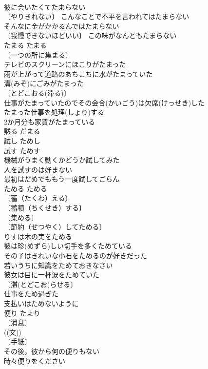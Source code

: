 \documentclass[8pt]{extreport}
\begin{document}
\begin{CJK}{UTF8}{min}
\\	彼に会いたくてたまらない 
\\	〔やりきれない〕 こんなことで不平を言われてはたまらない 
\\	そんなに金がかかるんではたまらない 
\\	〔我慢できないほどいい〕 この味がなんともたまらない 
\\	たまる	たまる	
\\	〔一つの所に集まる〕
\\	テレビのスクリーンにほこりがたまった 
\\	雨が上がって道路のあちこちに水がたまっていた 
\\	溝(みぞ)にごみがたまった 
\\	〔とどこおる(滞る)〕
\\	仕事がたまっていたのでその会合(かいごう)は欠席(けっせき)した 
\\	たまった仕事を処理(しょり)する 
\\	2か月分も家賃がたまっている 
\\	黙る	だまる	
\\	試し	ためし	
\\	試す	ためす	
\\	機械がうまく動くかどうか試してみた 
\\	人を試すのは好まない 
\\	最初はだめでももう一度試してごらん 
\\	ためる	ためる	
\\	〔蓄（たくわ）える〕
\\	〔蓄積（ちくせき）する〕
\\	〔集める〕
\\	〔節約（せつやく）してためる〕
\\	りすは木の実をためる 
\\	彼は珍(めずら)しい切手を多くためている 
\\	その子はきれいな小石をためるのが好きだった 
\\	若いうちに知識をためておきなさい 
\\	彼女は目に一杯涙をためていた 
\\	〔滞(とどこお)らせる〕
\\	仕事をため過ぎた 
\\	支払いはためないように 
\\	便り	たより	
\\	〔消息〕
\\	((文)) 
\\	〔手紙〕
\\	その後，彼から何の便りもない 
\\	時々便りをください 

\end{CJK}
\end{document}
